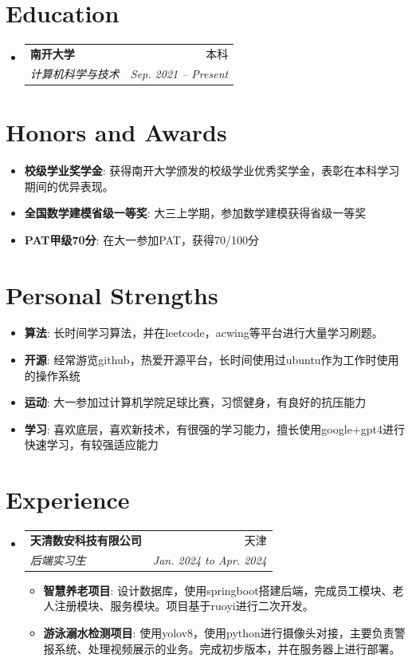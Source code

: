 \documentclass[letterpaper,11pt]{article}
\makeatletter
\newcommand{\resumeItem}[2]{
  \item\small{
    \textbf{#1}{: #2 \vspace{-2pt}}
  }
}
\newcommand{\resumeSubheading}[4]{
  \vspace{-1pt}\item
    \begin{tabular*}{0.97\textwidth}{l@{\extracolsep{\fill}}r}
      \textbf{#1} & #2 \\
      \textit{\small#3} & \textit{\small #4} \\
    \end{tabular*}\vspace{-5pt}
}
\newcommand{\resumeSubItem}[2]{\resumeItem{#1}{#2}\vspace{-4pt}}
\newcommand{\resumeSubHeadingListStart}{\begin{itemize}[leftmargin=*]}
\newcommand{\resumeSubHeadingListEnd}{\end{itemize}}
\newcommand{\resumeItemListStart}{\begin{itemize}}
\newcommand{\resumeItemListEnd}{\end{itemize}\vspace{-5pt}}
\makeatother
\begin{document}
\section{Education}
  \resumeSubHeadingListStart
    \resumeSubheading
      {南开大学}{本科}
      {计算机科学与技术}{Sep. 2021 -- Present}
  \resumeSubHeadingListEnd

\section{Honors and Awards}
  \resumeSubHeadingListStart
    \resumeSubItem{校级学业奖学金}
      {获得南开大学颁发的校级学业优秀奖学金，表彰在本科学习期间的优异表现。}
    \resumeSubItem{全国数学建模省级一等奖}
      {大三上学期，参加数学建模获得省级一等奖}
    \resumeSubItem{PAT甲级70分}
      {在大一参加PAT，获得70/100分}
  \resumeSubHeadingListEnd

\section{Personal Strengths}
    \resumeSubHeadingListStart
    \resumeSubItem
       {算法}
      {长时间学习算法，并在leetcode，acwing等平台进行大量学习刷题。} 
    \resumeSubItem{开源}
      {经常游览github，热爱开源平台，长时间使用过ubuntu作为工作时使用的操作系统} 
    \resumeSubItem{运动}
      {大一参加过计算机学院足球比赛，习惯健身，有良好的抗压能力}
    \resumeSubItem{学习}
      {喜欢底层，喜欢新技术，有很强的学习能力，擅长使用google+gpt4进行快速学习，有较强适应能力}
  \resumeSubHeadingListEnd


\section{Experience}
  \resumeSubHeadingListStart

    \resumeSubheading
      {天清数安科技有限公司}{天津}
      {后端实习生}{Jan. 2024 to Apr. 2024}
      \resumeItemListStart
        \resumeItem{智慧养老项目}
          {设计数据库，使用springboot搭建后端，完成员工模块、老人注册模块、服务模块。项目基于ruoyi进行二次开发。}
        \resumeItem{游泳溺水检测项目}
          {使用yolov8，使用python进行摄像头对接，主要负责警报系统、处理视频展示的业务。完成初步版本，并在服务器上进行部署。}
      \resumeItemListEnd

  \resumeSubHeadingListEnd
\end{document}
